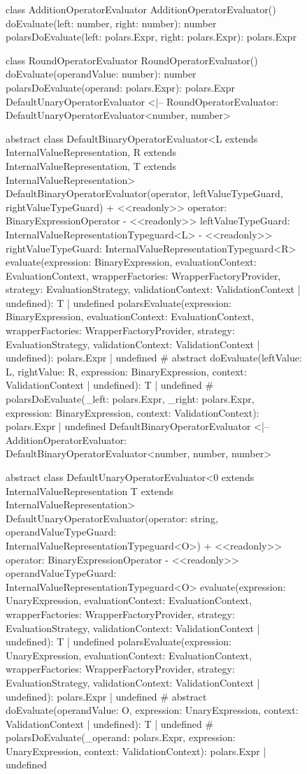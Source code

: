 \begin{figure}
	\begin{plantuml}
		class AdditionOperatorEvaluator {
				AdditionOperatorEvaluator()
				doEvaluate(left: number, right: number): number
				polarsDoEvaluate(left: polars.Expr, right: polars.Expr): polars.Expr
			}

		class RoundOperatorEvaluator {
				RoundOperatorEvaluator()
				doEvaluate(operandValue: number): number
				polarsDoEvaluate(operand: polars.Expr): polars.Expr
			}
		DefaultUnaryOperatorEvaluator <|-- RoundOperatorEvaluator: DefaultUnaryOperatorEvaluator<number, number>

		abstract class DefaultBinaryOperatorEvaluator<L extends InternalValueRepresentation, R extends InternalValueRepresentation, T extends InternalValueRepresentation> {
		DefaultBinaryOperatorEvaluator(operator, leftValueTypeGuard, rightValueTypeGuard)
		+ <<readonly>> operator: BinaryExpressionOperator
		- <<readonly>> leftValueTypeGuard: InternalValueRepresentationTypeguard<L>
		- <<readonly>> rightValueTypeGuard: InternalValueRepresentationTypeguard<R>
		evaluate(expression: BinaryExpression, evaluationContext: EvaluationContext, wrapperFactories: WrapperFactoryProvider, strategy: EvaluationStrategy, validationContext: ValidationContext | undefined): T | undefined
		polarsEvaluate(expression: BinaryExpression, evaluationContext: EvaluationContext, wrapperFactories: WrapperFactoryProvider, strategy: EvaluationStrategy, validationContext: ValidationContext | undefined): polars.Expr | undefined
		# {abstract} doEvaluate(leftValue: L, rightValue: R, expression: BinaryExpression, context: ValidationContext | undefined): T | undefined
		# polarsDoEvaluate(_left: polars.Expr, _right: polars.Expr, expression: BinaryExpression, context: ValidationContext): polars.Expr | undefined
		}
		DefaultBinaryOperatorEvaluator <|-- AdditionOperatorEvaluator: DefaultBinaryOperatorEvaluator<number, number, number>

		abstract class DefaultUnaryOperatorEvaluator<0 extends InternalValueRepresentation T extends InternalValueRepresentation> {
		DefaultUnaryOperatorEvaluator(operator: string, operandValueTypeGuard: InternalValueRepresentationTypeguard<O>)
		+ <<readonly>> operator: BinaryExpressionOperator
		- <<readonly>> operandValueTypeGuard: InternalValueRepresentationTypeguard<O>
		evaluate(expression: UnaryExpression, evaluationContext: EvaluationContext, wrapperFactories: WrapperFactoryProvider, strategy: EvaluationStrategy, validationContext: ValidationContext | undefined): T | undefined
		polarsEvaluate(expression: UnaryExpression, evaluationContext: EvaluationContext, wrapperFactories: WrapperFactoryProvider, strategy: EvaluationStrategy, validationContext: ValidationContext | undefined): polars.Expr | undefined
		# {abstract} doEvaluate(operandValue: O, expression: UnaryExpression, context: ValidationContext | undefined): T | undefined
		# polarsDoEvaluate(_operand: polars.Expr, expression: UnaryExpression, context: ValidationContext): polars.Expr | undefined
		}


\end{plantuml}
\end{figure}
